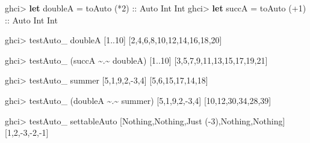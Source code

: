 \documentclass[]{article}
\newenvironment{Shaded}{}{}
\newcommand{\DataTypeTok}[1]{\textcolor[rgb]{0.56,0.13,0.00}{#1}}
\newcommand{\DecValTok}[1]{\textcolor[rgb]{0.25,0.63,0.44}{#1}}
\newcommand{\KeywordTok}[1]{\textcolor[rgb]{0.00,0.44,0.13}{\textbf{#1}}}
\newcommand{\NormalTok}[1]{#1}
\newcommand{\OperatorTok}[1]{\textcolor[rgb]{0.40,0.40,0.40}{#1}}
\newcommand{\OtherTok}[1]{\textcolor[rgb]{0.00,0.44,0.13}{#1}}
\begin{document}
\begin{Shaded}
\begin{Highlighting}[]
\NormalTok{ghci}\OperatorTok{>} \KeywordTok{let}\NormalTok{ doubleA  }\OtherTok{=}\NormalTok{ toAuto (}\OperatorTok{*}\DecValTok{2}\NormalTok{)}\OtherTok{      ::} \DataTypeTok{Auto} \DataTypeTok{Int} \DataTypeTok{Int}
\NormalTok{ghci}\OperatorTok{>} \KeywordTok{let}\NormalTok{ succA    }\OtherTok{=}\NormalTok{ toAuto (}\OperatorTok{+}\DecValTok{1}\NormalTok{)}\OtherTok{      ::} \DataTypeTok{Auto} \DataTypeTok{Int} \DataTypeTok{Int}

\NormalTok{ghci}\OperatorTok{>}\NormalTok{ testAuto\_ doubleA [}\DecValTok{1}\OperatorTok{..}\DecValTok{10}\NormalTok{]}
\NormalTok{[}\DecValTok{2}\NormalTok{,}\DecValTok{4}\NormalTok{,}\DecValTok{6}\NormalTok{,}\DecValTok{8}\NormalTok{,}\DecValTok{10}\NormalTok{,}\DecValTok{12}\NormalTok{,}\DecValTok{14}\NormalTok{,}\DecValTok{16}\NormalTok{,}\DecValTok{18}\NormalTok{,}\DecValTok{20}\NormalTok{]}

\NormalTok{ghci}\OperatorTok{>}\NormalTok{ testAuto\_ (succA }\OperatorTok{\textasciitilde{}.\textasciitilde{}}\NormalTok{ doubleA) [}\DecValTok{1}\OperatorTok{..}\DecValTok{10}\NormalTok{]}
\NormalTok{[}\DecValTok{3}\NormalTok{,}\DecValTok{5}\NormalTok{,}\DecValTok{7}\NormalTok{,}\DecValTok{9}\NormalTok{,}\DecValTok{11}\NormalTok{,}\DecValTok{13}\NormalTok{,}\DecValTok{15}\NormalTok{,}\DecValTok{17}\NormalTok{,}\DecValTok{19}\NormalTok{,}\DecValTok{21}\NormalTok{]}

\NormalTok{ghci}\OperatorTok{>}\NormalTok{ testAuto\_ summer [}\DecValTok{5}\NormalTok{,}\DecValTok{1}\NormalTok{,}\DecValTok{9}\NormalTok{,}\DecValTok{2}\NormalTok{,}\OperatorTok{{-}}\DecValTok{3}\NormalTok{,}\DecValTok{4}\NormalTok{]}
\NormalTok{[}\DecValTok{5}\NormalTok{,}\DecValTok{6}\NormalTok{,}\DecValTok{15}\NormalTok{,}\DecValTok{17}\NormalTok{,}\DecValTok{14}\NormalTok{,}\DecValTok{18}\NormalTok{]}

\NormalTok{ghci}\OperatorTok{>}\NormalTok{ testAuto\_ (doubleA }\OperatorTok{\textasciitilde{}.\textasciitilde{}}\NormalTok{ summer) [}\DecValTok{5}\NormalTok{,}\DecValTok{1}\NormalTok{,}\DecValTok{9}\NormalTok{,}\DecValTok{2}\NormalTok{,}\OperatorTok{{-}}\DecValTok{3}\NormalTok{,}\DecValTok{4}\NormalTok{]}
\NormalTok{[}\DecValTok{10}\NormalTok{,}\DecValTok{12}\NormalTok{,}\DecValTok{30}\NormalTok{,}\DecValTok{34}\NormalTok{,}\DecValTok{28}\NormalTok{,}\DecValTok{39}\NormalTok{]}

\NormalTok{ghci}\OperatorTok{>}\NormalTok{ testAuto\_ settableAuto [}\DataTypeTok{Nothing}\NormalTok{,}\DataTypeTok{Nothing}\NormalTok{,}\DataTypeTok{Just}\NormalTok{ (}\OperatorTok{{-}}\DecValTok{3}\NormalTok{),}\DataTypeTok{Nothing}\NormalTok{,}\DataTypeTok{Nothing}\NormalTok{]}
\NormalTok{[}\DecValTok{1}\NormalTok{,}\DecValTok{2}\NormalTok{,}\OperatorTok{{-}}\DecValTok{3}\NormalTok{,}\OperatorTok{{-}}\DecValTok{2}\NormalTok{,}\OperatorTok{{-}}\DecValTok{1}\NormalTok{]}


\end{Highlighting}
\end{Shaded}
\end{document}
